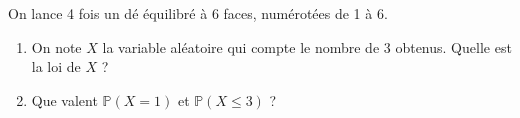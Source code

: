 \documentclass[11pt,fleqn, openany]{book} %
\begin{document}
%
%
%




\begin{exercise}On lance 4 fois un dé équilibré à 6 faces, numérotées de 1 à 6. 
\begin{enumerate}
\item On note $X$ la variable aléatoire qui compte le nombre de 3 obtenus. Quelle est la loi de $X$ ?
\item Que valent $\mathbb{P}(X=1)$ et $\mathbb{P}(X \leqslant 3)$ ?
\end{enumerate} \newpage \end{exercise}
\end{document}
